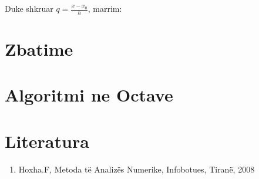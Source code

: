 \documentclass[12pt, margin=1in, a4paper]{article}
\begin{document}
  Duke shkruar \(q = \frac{x - x_0}{h}\), marrim:



\section{Zbatime}

\section{Algoritmi ne Octave}

\section{Literatura}
\begin{enumerate}
  \item Hoxha.F, Metoda të Analizës Numerike, Infobotues, Tiranë, 2008
\end{enumerate}
\end{document}
